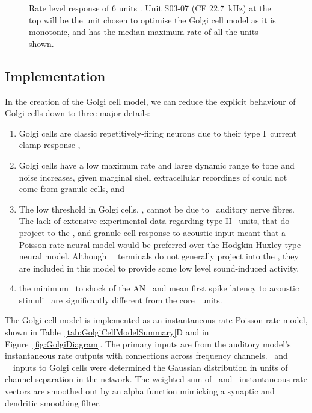 
\begin{figure}[htp!]
   \centering
  \caption[Rate level response of marginal shell units]{Rate level response of 6 units \citep[Reproduced with permission Fig.~2]{GhoshalKim:1997}.
Unit S03-07 (CF 22.7~kHz) at the top will be the unit chosen to optimise the Golgi cell model as it is monotonic, and has the median maximum rate of all the units shown. 
\label{fig:GolgiKimFig2}}
\end{figure}


\subsection{Implementation}

In the creation of the Golgi cell model, we can reduce the explicit behaviour of Golgi cells down to three major details:
 \begin{enumerate}
 \item Golgi cells are classic repetitively-firing neurons due to their type I~current clamp response \citep{FerragamoGoldingEtAl:1998},
 \item Golgi cells have a low maximum rate and large dynamic range to tone and noise increases, given marginal shell extracellular recordings of \citet{GhoshalKim:1997} could not come from granule cells, and
 \item The low threshold in Golgi cells, \citet{GhoshalKim:1997}, can\-not be due to \LSR~auditory nerve fibres.
The lack of extensive experimental data regarding type II \ANF~units, that do project to the \GCD, and granule cell response to acoustic input meant that a Poisson rate neural model would be preferred over the Hodgkin-Huxley type neural model.
Although \HSR~\ANF~terminals do not generally project into the \GCD, they are included in this model to provide some low level sound-induced activity.
 \item the minimum \EPSP~to shock of the AN~\citep{FerragamoGoldingEtAl:1998} and mean first spike latency to acoustic stimuli~\citep{GhoshalKim:1997} are significantly different from the core \VCN~units.
 \end{enumerate}



The Golgi cell model is implemented as an instantaneous-rate Poisson rate model, shown in Table~\ref{tab:GolgiCellModelSummary}D and in Figure~\ref{fig:GolgiDiagram}.
The primary inputs are from the auditory model's instantaneous rate outputs with connections across frequency channels.
\HSR~and \LSR~\ANF~inputs to Golgi cells were determined the Gaussian distribution in units of channel separation in the network.
The weighted sum of \HSR~and \LSR~instantaneous-rate vectors are smoothed out by an alpha function mimicking a synaptic and dendritic smoothing filter.

